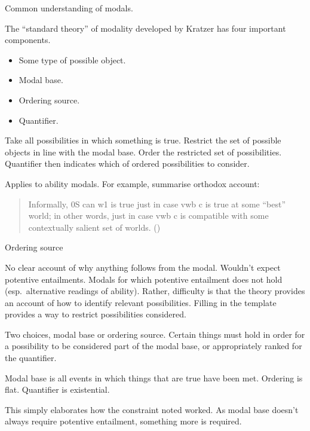 \begin{note}
  Common understanding of modals.

  The ``standard theory'' of modality developed by Kratzer has four important components.
  \begin{itemize}
  \item Some type of possible object.
  \item Modal base.
  \item Ordering source.
  \item Quantifier.
  \end{itemize}
  Take all possibilities in which something is true.
  Restrict the set of possible objects in line with the modal base.
  Order the restricted set of possibilities.
  Quantifier then indicates which of ordered possibilities to consider.

  Applies to ability modals.
  For example, \citeauthor{Mandelkern:2017aa} summarise orthodox account:
  \begin{quote}
    Informally, 0S can w1 is true just in case vwb c is true at some “best” world; in other words, just in case vwb c is compatible with some contextually salient set of worlds.\nolinebreak
    \mbox{}\hfill\mbox{(\citeyear[304]{Mandelkern:2017aa})}
  \end{quote}
  Ordering source

  No clear account of why anything follows from the modal.
  Wouldn't expect potentive entailments.
  Modals for which potentive entailment does not hold (esp.\ alternative readings of ability).
  Rather, difficulty is that the theory provides an account of how to identify relevant possibilities.
  Filling in the template provides a way to restrict possibilities considered.

  Two choices, modal base or ordering source.
  Certain things must hold in order for a possibility to be considered part of the modal base, or appropriately ranked for the quantifier.

  Modal base is all events in which things that are true have been met.
  Ordering is flat.
  Quantifier is existential.

  This simply elaborates how the constraint noted worked.
  As modal base doesn't always require potentive entailment, something more is required.
\end{note}

